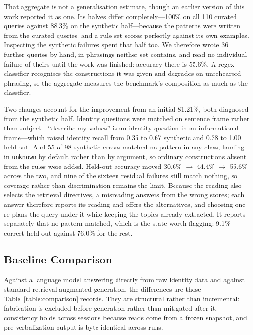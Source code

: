 \documentclass[conference]{IEEEtran}
\begin{document}
That aggregate is not a generalisation estimate, though an earlier version of this work reported it as one. Its halves differ completely---100\% on all 110 curated queries against 88.3\% on the synthetic half---because the patterns were written from the curated queries, and a rule set scores perfectly against its own examples. Inspecting the synthetic failures spent that half too. We therefore wrote 36 further queries by hand, in phrasings neither set contains, and read no individual failure of theirs until the work was finished: accuracy there is 55.6\%. A regex classifier recognises the constructions it was given and degrades on unrehearsed phrasing, so the aggregate measures the benchmark's composition as much as the classifier.

Two changes account for the improvement from an initial 81.21\%, both diagnosed from the synthetic half. Identity questions were matched on sentence frame rather than subject---``describe my values'' is an identity question in an informational frame---which raised identity recall from 0.35 to 0.67 synthetic and 0.38 to 1.00 held out. And 55 of 98 synthetic errors matched no pattern in any class, landing in \texttt{unknown} by default rather than by argument, so ordinary constructions absent from the rules were added. Held-out accuracy moved 30.6\% $\rightarrow$ 44.4\% $\rightarrow$ 55.6\% across the two, and nine of the sixteen residual failures still match nothing, so coverage rather than discrimination remains the limit. Because the reading also selects the retrieval directives, a misreading answers from the wrong stores; each answer therefore reports its reading and offers the alternatives, and choosing one re-plans the query under it while keeping the topics already extracted. It reports separately that no pattern matched, which is the state worth flagging: 9.1\% correct held out against 76.0\% for the rest.

\subsection{Baseline Comparison}
Against a language model answering directly from raw identity data and against standard retrieval-augmented generation, the differences are those Table~\ref{table:comparison} records. They are structural rather than incremental: fabrication is excluded before generation rather than mitigated after it, consistency holds across sessions because reads come from a frozen snapshot, and pre-verbalization output is byte-identical across runs.
\end{document}
